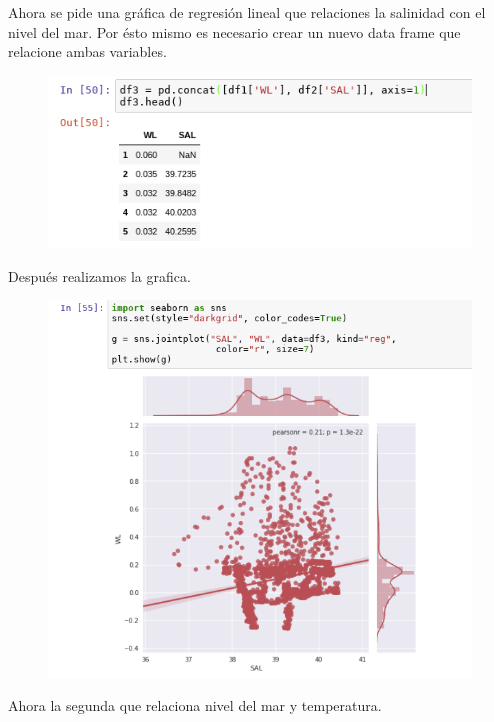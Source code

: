 \documentclass{article}
\begin{document}
Ahora se pide una gráfica de regresión lineal que relaciones la salinidad con el nivel del mar. Por ésto mismo es necesario crear un nuevo data frame que relacione ambas variables.\\
\begin{figure}[H]
	\centering
    \includegraphics[width=\linewidth]{df3.png}\\
\end{figure}
Después realizamos la grafica.\\
\begin{figure}[H]
	\centering
    \includegraphics[width=\linewidth]{reg1.png}\\
\end{figure}
Ahora la segunda que relaciona nivel del mar y temperatura.\\
\end{document}
